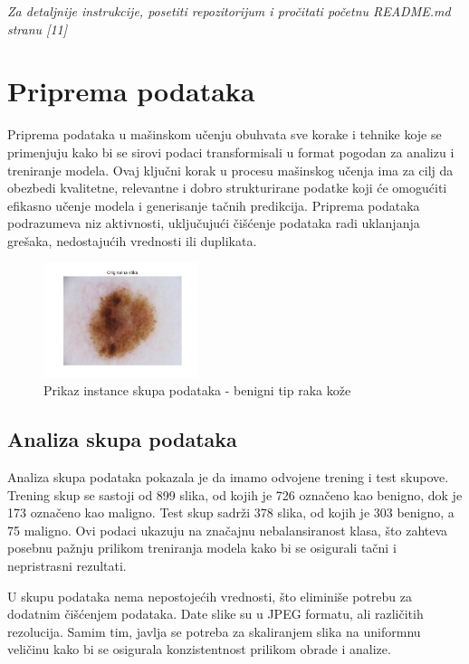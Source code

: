 \documentclass{article}
\begin{document}
\textit{Za detaljnije instrukcije, posetiti repozitorijum i pročitati početnu README.md stranu [11]}

\section{Priprema podataka}
Priprema podataka u mašinskom učenju obuhvata sve korake i tehnike koje se primenjuju kako bi se sirovi podaci transformisali u format pogodan za analizu i treniranje modela. Ovaj ključni korak u procesu mašinskog učenja ima za cilj da obezbedi kvalitetne, relevantne i dobro strukturirane podatke koji će omogućiti efikasno učenje modela i generisanje tačnih predikcija. Priprema podataka podrazumeva niz aktivnosti, uključujući čišćenje podataka radi uklanjanja grešaka, nedostajućih vrednosti ili duplikata.

\begin{figure}[H]
    \centering
    \includegraphics[width=0.4\textwidth]{slike_raka/original_image.png} 
    \caption{Prikaz instance skupa podataka - benigni tip raka kože} 
    \label{instanca skupa podataka}
\end{figure}

\subsection{Analiza skupa podataka}

Analiza skupa podataka pokazala je da imamo odvojene trening i test skupove. Trening skup se sastoji od 899 slika, od kojih je 726 označeno kao benigno, dok je 173 označeno kao maligno. Test skup sadrži 378 slika, od kojih je 303 benigno, a 75 maligno. Ovi podaci ukazuju na značajnu nebalansiranost klasa, što zahteva posebnu pažnju prilikom treniranja modela kako bi se osigurali tačni i nepristrasni rezultati.
\par
U skupu podataka nema nepostojećih vrednosti, što eliminiše potrebu za dodatnim čišćenjem podataka. Date slike su u JPEG formatu, ali različitih rezolucija. Samim tim, javlja se potreba za skaliranjem slika na uniformnu veličinu kako bi se osigurala konzistentnost prilikom obrade i analize.
\end{document}
